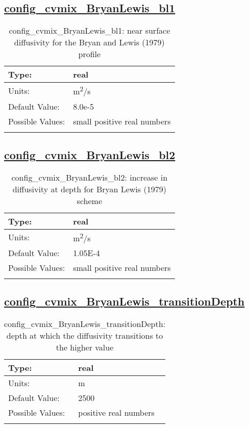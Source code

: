 \subsection[config\_cvmix\_BryanLewis\_bl1]{\hyperref[sec:nm_tab_cvmix]{config\_cvmix\_BryanLewis\_bl1}}
\label{subsec:nm_sec_config_cvmix_BryanLewis_bl1}
\begin{center}
\begin{longtable}{| p{2.0in} || p{4.0in} |}
    \hline
    Type: & real \\
    \hline
    Units: & \si{m^2/s} \\
    \hline
    Default Value: & 8.0e-5 \\
    \hline
    Possible Values: & small positive real numbers \\
    \hline
    \caption{config\_cvmix\_BryanLewis\_bl1: near surface diffusivity for the Bryan and Lewis (1979) profile}
\end{longtable}
\end{center}
\subsection[config\_cvmix\_BryanLewis\_bl2]{\hyperref[sec:nm_tab_cvmix]{config\_cvmix\_BryanLewis\_bl2}}
\label{subsec:nm_sec_config_cvmix_BryanLewis_bl2}
\begin{center}
\begin{longtable}{| p{2.0in} || p{4.0in} |}
    \hline
    Type: & real \\
    \hline
    Units: & \si{m^2/s} \\
    \hline
    Default Value: & 1.05E-4 \\
    \hline
    Possible Values: & small positive real numbers \\
    \hline
    \caption{config\_cvmix\_BryanLewis\_bl2: increase in diffusivity at depth for Bryan Lewis (1979) scheme}
\end{longtable}
\end{center}
\subsection[config\_cvmix\_BryanLewis\_transitionDepth]{\hyperref[sec:nm_tab_cvmix]{config\_cvmix\_BryanLewis\_transitionDepth}}
\label{subsec:nm_sec_config_cvmix_BryanLewis_transitionDepth}
\begin{center}
\begin{longtable}{| p{2.0in} || p{4.0in} |}
    \hline
    Type: & real \\
    \hline
    Units: & \si{m} \\
    \hline
    Default Value: & 2500 \\
    \hline
    Possible Values: & positive real numbers \\
    \hline
    \caption{config\_cvmix\_BryanLewis\_transitionDepth: depth at which the diffusivity transitions to the higher value}
\end{longtable}
\end{center}
